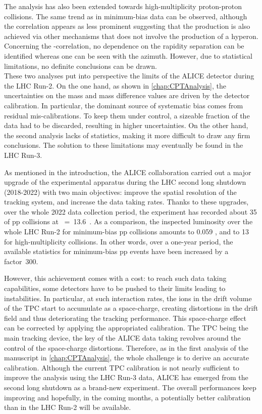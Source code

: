 The analysis has also been extended towards high-multiplicity proton-proton collisions. The same trend as in minimum-bias data can be observed, although the correlation appears as less prominent suggesting that the \rmPhiMes production is also achieved via other mechanisms that does not involve the production of a \rmXiPM hyperon. Concerning the \rmOmegaPM-\rmPhiMes correlation, no dependence on the rapidity separation can be identified whereas one can be seen with the azimuth. However, due to statistical limitations, no definite conclusions can be drawn.\\

These two analyses put into perspective the limits of the ALICE detector during the LHC Run-2. On the one hand, as shown in \chap\ref{chap:CPTAnalysis}, the uncertainties on the mass and mass difference values are driven by the detector calibration. In particular, the dominant source of systematic bias comes from residual mis-calibrations. To keep them under control, a sizeable fraction of the data had to be discarded, resulting in higher uncertainties. On the other hand, the second analysis lacks of statistics, making it more difficult to draw any firm conclusions. The solution to these limitations may eventually be found in the LHC Run-3.

As mentioned in the introduction, the ALICE collaboration carried out a major upgrade of the experimental apparatus during the LHC second long shutdown (2018-2022) with two main objectives: improve the spatial resolution of the tracking system, and increase the data taking rates. Thanks to these upgrades, over the whole 2022 data collection period, the experiment has recorded about 35 \invpb of pp collisions at \sqrtS~=~13.6~\tev \cite{cern152ndLHCCMeeting2022}. As a comparison, the inspected luminosity over the whole LHC Run-2 for minimum-bias pp collisions amounts to 0.059 \invpb, and to 13 \invpb for high-multiplicity collisions. In other words, over a one-year period, the available statistics for minimum-bias pp events have been increased by a factor~300.

However, this achievement comes with a cost: to reach such data taking capabilities, some detectors have to be pushed to their limits leading to instabilities. In particular, at such interaction rates, the ions in the drift volume of the TPC start to accumulate as a space-charge, creating distortions in the drift field and thus deteriorating the tracking performance. This space-charge effect can be corrected by applying the appropriated calibration. The TPC being the main tracking device, the key of the ALICE data taking revolves around the control of the space-charge distortions. Therefore, as in the first analysis of the manuscript in \chap\ref{chap:CPTAnalysis}, the whole challenge is to derive an accurate calibration. Although the current TPC calibration is not nearly sufficient to improve the analysis using the LHC Run-3 data, ALICE has emerged from the second long shutdown as a brand-new experiment. The overall performances keep improving and hopefully, in the coming months, a potentially better calibration than in the LHC Run-2 will be available.

